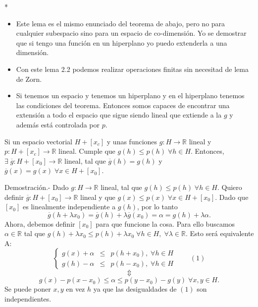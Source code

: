 \begin{paracol}{2}
\switchcolumn[1]*{\noindent\scriptsize
    \begin{itemize}
	\item Este lema es el mismo enunciado del teorema de abajo, pero no para cualquier subespacio sino para un espacio de co-dimensión. Yo se demostrar que si tengo una función en un hiperplano yo puedo extenderla a una dimensión. 
	\item Con este lema 2.2 podemos realizar operaciones finitas sin necesitad de lema de Zorn.
	\item Si tenemos un espacio y tenemos un hiperplano y en el hiperplano tenemos las condiciones del teorema. Entonces somos capaces de encontrar una extensión a todo el espacio que sigue siendo lineal que extiende a la $g$ y además está controlada por $p$.
    \end{itemize}
}
\switchcolumn[0]\noindent

\begin{lema}
    Si un espacio vectorial $H+[x_c]$ y unas funciones $g:H\to \mathbb{R}$ lineal y $p:H+[x_c]\to \mathbb{R}$ lineal. Cumple que $g(h)\leq p(h)\; \forall h\in H$. Entonces, $\exists\; \overline{g}:H+[x_0]\to \mathbb{R}$ lineal, tal que $\overline{g}(h)=g(h)$ y $\overline{g}(x)=g(x)\; \forall x\in H+[x_0]$.

	Demostración.-\; Dado $g:H\to \mathbb{R}$ lineal, tal que $g(h)\leq p(h)\; \forall h\in H$. Quiero definir $\overline{g}:H+[x_0]\to \mathbb{R}$ lineal y que $g(x)\leq p(x)\; \forall x\in H+[x_0]$. Dado que $[x_0]$ es linealmente independiente a $g(h)$, por lo tanto
	$$\overline{g}\left(h+\lambda x_0\right)=\overline{g}(h)+\lambda \overline{g}(x_0)=\alpha=g(h)+\lambda \alpha.$$
	Ahora, debemos definir $[x_0]$ para que funcione la cosa. Para ello buscamos $\alpha\in \mathbb{R}$ tal que $g(h)+\lambda x_0\leq p(h)+\lambda x_0\; \forall h\in H, \;\forall \lambda\in \mathbb{R}.$
	Esto será equivalente A:
	$$
	\left\{
	    \begin{array}{rcl}
		g(x)+\alpha&\leq&p(h+x_0),\; \forall h\in H\\
		g(h)-\alpha&\leq&p(h-x_0),\; \forall h\in H
	    \end{array}
	\right. \qquad (1)
	$$
	$$\Updownarrow$$
	$$g(x)-p(x-x_0)\leq \alpha \leq p(y-x_0)-g(y)\; \forall x,y\in H.$$
	Se puede poner $x,y$ en vez $h$ ya que las desigualdades de $(1)$ son independientes.


\end{lema}
\end{paracol}
